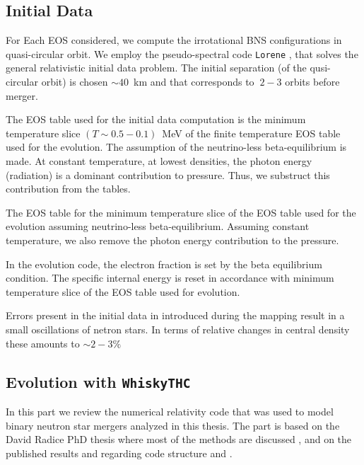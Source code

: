 \subsection{Initial Data}

For Each EOS considered, we compute the irrotational BNS configurations in quasi-circular orbit.
We employ the pseudo-spectral code \texttt{Lorene} \citep{Gourgoulhon:2000nn}, that 
solves the general relativistic initial data problem.
The initial separation (of the qusi-circular orbit) is chosen $\sim40$~km and that corresponds to $~2-3$ orbits before merger.

The EOS table used for the initial data computation is the minimum temperature slice
$(T\sim 0.5 - 0.1)$~MeV of the finite temperature EOS table used for the evolution.
The assumption of the neutrino-less beta-equilibrium is made.
At constant temperature, at lowest densities, the photon energy (radiation) is a dominant contribution to 
pressure. Thus, we substruct this contribution from the tables.

The EOS table for the minimum temperature slice of the EOS table used for the evolution assuming neutrino-less beta-equilibrium.
Assuming constant temperature, we also remove the photon energy contribution to the pressure.

In the evolution code, the electron fraction is set by the beta equilibrium condition. 
The specific internal energy is reset in accordance with minimum temperature slice of the EOS table used for evolution.

Errors present in the initial data in introduced during the mapping result in a small oscillations of netron stars.
In terms of relative changes in central density these amounts to $\sim2-3\%$ \cite{Radice:2018pdn}


\subsection{Evolution with \texttt{WhiskyTHC}}


In this part we review the numerical relativity code that was used to model binary neutron star mergers analyzed in this thesis.
The part is based on the David Radice PhD thesis where most of the methods are discussed \cite{Radice:2013apa}, and on the published results and regarding code structure and \cite{Radice:2012cu,Radice:2013xpa,Radice:2013hxh,Radice:2015nva}.

